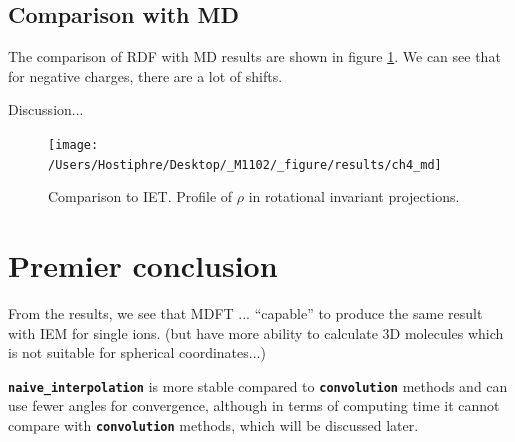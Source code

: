 \subsection{Comparison with MD}

The comparison of RDF with MD results are shown in figure \ref{fig:Comparison-to-MD}.
We can see that for negative charges, there are a lot of shifts.

Discussion...

\begin{figure}[H]
\begin{centering}
\texttt{[image: /Users/Hostiphre/Desktop/\_M1102/\_figure/results/ch4\_md]}
\par\end{centering}
\caption{Comparison to IET. Profile of $\rho$ in rotational invariant projections.\label{fig:Comparison-to-MD}}
\end{figure}


\section{Premier conclusion}

From the results, we see that MDFT ... ``capable'' to produce the %
same result with IEM for single ions. (but have more ability to calculate
3D molecules which is not suitable for spherical coordinates...)

\texttt{\textbf{naive\_interpolation}} is more stable compared to
\texttt{\textbf{convolution}} methods and can use fewer angles for
convergence, although in terms of computing time it cannot compare with
\texttt{\textbf{convolution}} methods, which will be discussed later.

